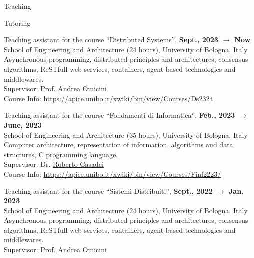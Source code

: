 \documentclass{resume} %
\begin{document}
    \begin{rSection}{Teaching}


        \begin{rSubsection}{Tutoring}{}{}{}
            \item Teaching assistant for the course ``Distributed Systems'', \textbf{Sept., 2023 $\rightarrow$ Now}
            \\School of Engineering and Architecture (24 hours), University of Bologna, Italy
            \\Asynchronous programming, distributed principles and architectures, consensus algorithms, ReSTfull web-services, containers, agent-based technologies and middlewares.
            \\Supervisor: Prof. \href{mailto:andrea.omicini@unibo.it}{Andrea Omicini}
            \\Course Info: \url{https://apice.unibo.it/xwiki/bin/view/Courses/Ds2324}
            \item Teaching assistant for the course ``Fondamenti di Informatica'', \textbf{Feb., 2023 $\rightarrow$ June, 2023}
            \\School of Engineering and Architecture (35 hours), University of Bologna, Italy
            \\Computer architecture, representation of information, algorithms and data structures, C programming language.
            \\Supervisor: Dr. \href{mailto:roberto.casadei@unibo.it}{Roberto Casadei}
            \\Course Info: \url{https://apice.unibo.it/xwiki/bin/view/Courses/Finf2223/}
            \item Teaching assistant for the course ``Sistemi Distribuiti'', \textbf{Sept., 2022 $\rightarrow$ Jan. 2023}
            \\School of Engineering and Architecture (24 hours), University of Bologna, Italy
            \\Asynchronous programming, distributed principles and architectures, consensus algorithms, ReSTfull web-services, containers, agent-based technologies and middlewares.
            \\Supervisor: Prof. \href{mailto:andrea.omicini@unibo.it}{Andrea Omicini}

\end{rSubsection}
\end{rSection}
\end{document}
